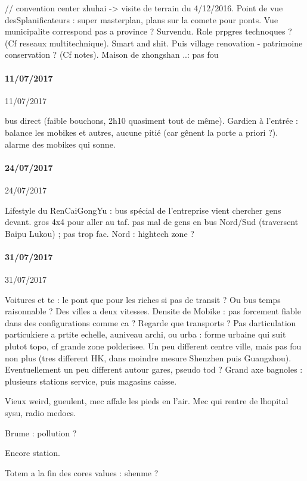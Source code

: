 // convention center zhuhai -> visite de terrain du 4/12/2016.
Point de vue desSplanificateurs : super masterplan, plans sur la comete pour ponts. Vue municipalite correspond pas a province ? Survendu. Role prpgres technoques ? (Cf reseaux multitechnique). Smart and shit. Puis village renovation - patrimoine conservation ? (Cf notes). Maison de zhongshan ..: pas fou


\paragraph{11/07/2017}{11/07/2017}

bus direct (faible bouchons, 2h10 quasiment tout de même). Gardien à l'entrée : balance les mobikes et autres, aucune pitié (car gênent la porte a priori ?). alarme des mobikes qui sonne.



\paragraph{24/07/2017}{24/07/2017}

Lifestyle du RenCaiGongYu : bus spécial de l'entreprise vient chercher gens devant. gros 4x4 pour aller au taf. pas mal de gens en bus Nord/Sud (traversent Baipu Lukou) ; pas trop fac. Nord : hightech zone ?




\paragraph{31/07/2017}{31/07/2017}

Voitures et tc : le pont que pour les riches si pas de transit ? Ou bus temps raisonnable ?
Des villes a deux vitesses.
Densite de Mobike : pas forcement fiable dans des configurations comme ca ?
Regarde que transports ? Pas darticulation particukiere a prtite echelle, auniveau archi, ou urba : forme urbaine qui suit plutot topo, cf grande zone polderisee. Un peu different centre ville, mais pas fou non plus (tres different HK, dans moindre mesure Shenzhen puis Guangzhou). Eventuellement un peu different autour gares, pseudo tod ?
Grand axe bagnoles : plusieurs stations service, puis magasins caisse.

Vieux weird, gueulent, mec affale les pieds en l'air.
Mec qui rentre de lhopital sysu, radio medocs.

Brume : pollution ?

Encore station.

Totem a la fin des cores values : shenme ?

